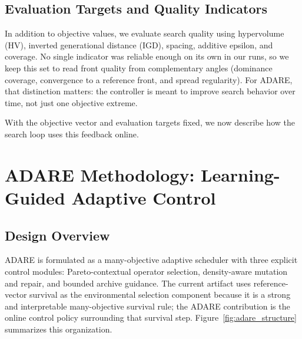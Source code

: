 \documentclass[preprint,12pt]{elsarticle}
\begin{document}
\subsection{Evaluation Targets and Quality Indicators}
In addition to objective values, we evaluate search quality using hypervolume (HV), inverted generational distance (IGD), spacing, additive epsilon, and coverage. No single indicator was reliable enough on its own in our runs, so we keep this set to read front quality from complementary angles (dominance coverage, convergence to a reference front, and spread regularity). For ADARE, that distinction matters: the controller is meant to improve search behavior over time, not just one objective extreme.

With the objective vector and evaluation targets fixed, we now describe how the search loop uses this feedback online.

\section{ADARE Methodology: Learning-Guided Adaptive Control}
\subsection{Design Overview}
ADARE is formulated as a many-objective adaptive scheduler with three explicit control modules: Pareto-contextual operator selection, density-aware mutation and repair, and bounded archive guidance. The current artifact uses reference-vector survival as the environmental selection component because it is a strong and interpretable many-objective survival rule; the ADARE contribution is the online control policy surrounding that survival step. Figure~\ref{fig:adare_structure} summarizes this organization.
\end{document}
